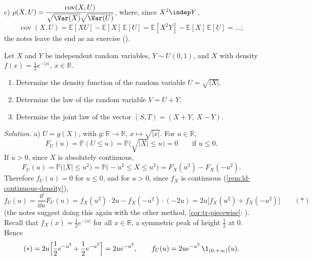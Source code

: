 \begin{example}
c) $\rho(X,U)=\dfrac{\operatorname{cov}(X,U)}{\sqrt{\Var(X)}\sqrt{\Var(U)}}$, where, since
$X^2\indep Y$,
\[
  \operatorname{cov}(X,U)=\mathbb E[XU]-\mathbb E[X]\,\mathbb E[U]=\mathbb E[X^2Y]-\mathbb E[X]\,\mathbb E[U]=\dots;
\]
the notes leave the end as an exercise ().
\end{example}

\begin{example}\label{exa:rv-laplace-uniform}
Let $X$ and $Y$ be independent random variables, $Y\sim U(0,1)$, and $X$ with density
$f(x)=\frac12e^{-|x|}$, $x\in\mathbb R$.
\begin{enumerate}[label=\alph*)]
  \item Determine the density function of the random variable $U=\sqrt{|X|}$.
  \item Determine the law of the random variable $V=U+Y$.
  \item Determine the joint law of the vector $(S,T)=(X+Y,\ X-Y)$.
\end{enumerate}

\emph{Solution.} a) $U=g(X)$, with $g:\mathbb R\to\mathbb R$, $x\mapsto\sqrt{|x|}$. For $u\in\mathbb R$,
\[
  F_U(u)=\mathbb P(U\le u)=\mathbb P\big(\sqrt{|X|}\le u\big)=0\qquad\text{if }u\le0 .
\]
If $u>0$, since $X$ is absolutely continuous,
\[
  F_U(u)=\mathbb P\big(|X|\le u^2\big)=\mathbb P\big(-u^2\le X\le u^2\big)=F_X(u^2)-F_X(-u^2).
\]
Therefore $f_U(u)=0$ for $u\le0$, and for $u>0$, since $f_X$ is continuous
(\cref{rem:ld-continuous-density}),
\[
  f_U(u)=\frac{\dd}{\dd u}F_U(u)=f_X(u^2)\cdot2u-f_X(-u^2)\cdot(-2u)=2u\big[f_X(u^2)+f_X(-u^2)\big]\qquad(*)
\]
(the notes suggest doing this again with the other method, \cref{cor:tr-piecewise}:
). Recall that $f_X(x)=\frac12e^{-|x|}$ for all $x\in\mathbb R$, a
symmetric peak of height $\frac12$ at $0$. Hence
\[
  (*)=2u\Big[\frac12e^{-u^2}+\frac12e^{-u^2}\Big]=2ue^{-u^2},\qquad
  f_U(u)=2ue^{-u^2}\,\1_{(0,+\infty)}(u).
\]


\end{example}

